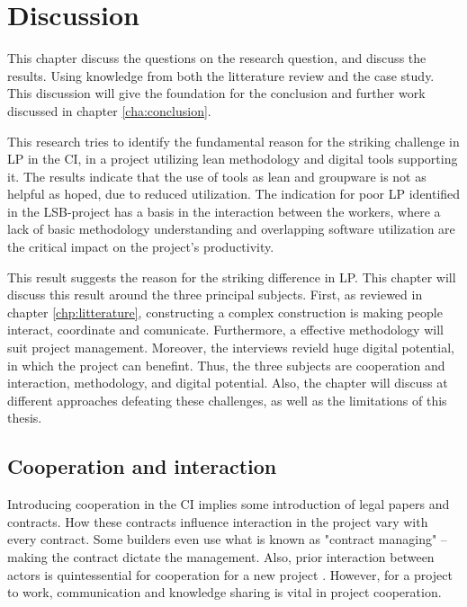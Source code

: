 
\chapter{Discussion} \label{cha:discussion}
This chapter discuss the questions on the research question, and discuss the results. Using knowledge from both the litterature review and the case study. This discussion will give the foundation for the conclusion and further work discussed in chapter \ref{cha:conclusion}. 

This research tries to identify the fundamental reason for the striking challenge in LP in the CI, in a project utilizing lean methodology and digital tools supporting it. The results indicate that the use of tools as lean and groupware is not as helpful as hoped, due to reduced utilization. The indication for poor LP identified in the LSB-project has a basis in the interaction between the workers, where a lack of basic methodology understanding and overlapping software utilization are the critical impact on the project's productivity. 

This result suggests the reason for the striking difference in LP. This chapter will discuss this result around the three principal subjects. First, as reviewed in chapter \ref{chp:litterature}, constructing a complex construction is making people interact, coordinate and comunicate. Furthermore, a effective methodology will suit project management. Moreover, the interviews revield huge digital potential, in which the project can benefint. Thus, the three subjects are cooperation and interaction, methodology, and digital potential. Also, the chapter will discuss at different approaches defeating these challenges, as well as the limitations of this thesis.

\section{Cooperation and interaction}
Introducing cooperation in the CI implies some introduction of legal papers and contracts. How these contracts influence interaction in the project vary with every contract. Some builders even use what is known as "contract managing" – making the contract dictate the management. Also, prior interaction between actors is quintessential for cooperation for a new project \cite{rolfsen}. However, for a project to work, communication and knowledge sharing is vital in project cooperation. 

